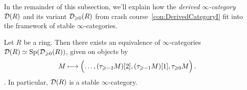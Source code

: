 In the remainder of this subsection, we'll explain how the \emph{derived $\infty$-category} $\mathcal{D}(R)$ and its variant $\mathcal{D}_{\geqslant 0}(R)$ from crash course~\cref{con:DerivedCategoryI} fit into the framework of stable $\infty$-categories.
\begin{lem}\label{lem:DRStable}
	Let $R$ be a  ring. Then there exists an equivalence of $\infty$-categories $\mathcal{D}(R)\simeq \mathrm{Sp}(\mathcal{D}_{\geqslant 0}(R))$, given on objects by
	\begin{equation*}
		M\longmapsto\Bigl(\dotsc,(\tau_{\geqslant -2}M)[2],(\tau_{\geqslant -1}M)[1],\tau_{\geqslant 0}M\Bigr)\,.
	\end{equation*}
	. In particular, $\mathcal{D}(R)$ is a stable $\infty$-category.
\end{lem}
